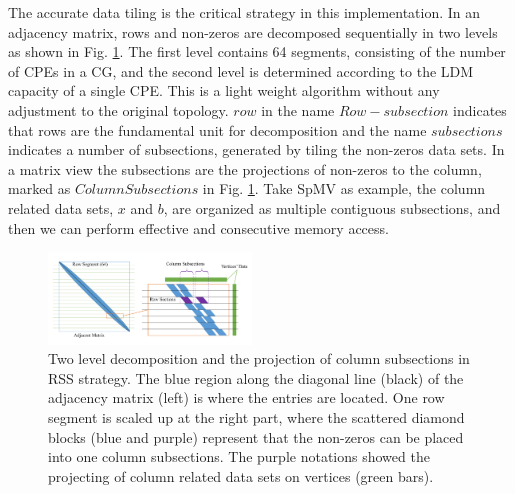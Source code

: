 \documentclass[5p,times]{elsarticle}
\begin{document}
The accurate data tiling is the critical strategy in this implementation. In an adjacency matrix, rows and non-zeros are decomposed sequentially in two levels as shown in Fig. \ref{rss(overview)}. The first level contains 64 segments, consisting of the number of CPEs in a CG, and the second level is determined according to the LDM capacity of a single CPE. This is a light weight algorithm without any adjustment to the original topology. $row$ in the name $Row-subsection$ indicates that rows are the fundamental unit for decomposition and the name $subsections$ indicates a number of subsections, generated by tiling the non-zeros data sets. In a matrix view the subsections are the projections of non-zeros to the column, marked as $Column Subsections$ in Fig. \ref{rss(overview)}. Take SpMV as example, the column related data sets, $x$ and $b$, are organized as multiple contiguous subsections, and then we can perform effective and consecutive memory access.
\begin{figure}[tbp]
	\centerline{\includegraphics[width=0.48\textwidth]{rss(overview).pdf}}
	\caption{Two level decomposition and the projection of column subsections in RSS strategy. The blue region along the diagonal line (black) of the adjacency matrix (left) is where the entries are located. One row segment is scaled up at the right part, where the scattered diamond blocks (blue and purple) represent that the non-zeros can be placed into one column subsections. The purple notations showed the projecting of column related data sets on vertices (green bars).}
	\label{rss(overview)}
\end{figure}
\end{document}
